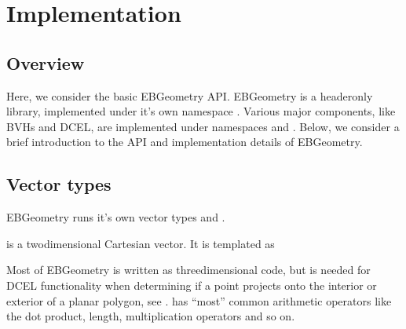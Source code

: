 \documentclass[letterpaper,10pt,english]{sphinxmanual}
\begin{document}
\chapter{Implementation}
\label{\detokenize{index:implementation}}
\sphinxstepscope


\section{Overview}
\label{\detokenize{Implementation:overview}}\label{\detokenize{Implementation:chap-implementation}}\label{\detokenize{Implementation::doc}}
\sphinxAtStartPar
Here, we consider the basic EBGeometry API.
EBGeometry is a header\sphinxhyphen{}only library, implemented under it’s own namespace .
Various major components, like BVHs and DCEL, are implemented under namespaces  and .
Below, we consider a brief introduction to the API and implementation details of EBGeometry.

\sphinxstepscope


\section{Vector types}
\label{\detokenize{ImplemVec:vector-types}}\label{\detokenize{ImplemVec:chap-vector}}\label{\detokenize{ImplemVec::doc}}
\sphinxAtStartPar
EBGeometry runs it’s own vector types  and .

\sphinxAtStartPar
{} is a two\sphinxhyphen{}dimensional Cartesian vector.
It is templated as

\begin{sphinxVerbatim}[commandchars=\\\{\}]
  
    
     
        
        
\end{sphinxVerbatim}

\sphinxAtStartPar
Most of EBGeometry is written as three\sphinxhyphen{}dimensional code, but  is needed for DCEL functionality when determining if a point projects onto the interior or exterior of a planar polygon, see {\hyperref[\detokenize{DCEL:chap-dcel}]{}}.
 has “most” common arithmetic operators like the dot product, length, multiplication operators and so on.
\end{document}
